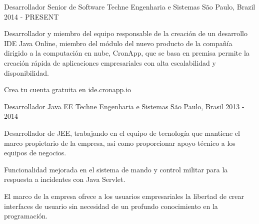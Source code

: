 

\begin{cventries}

  \cventry
    {Desarrollador Senior de Software} %
    {Techne Engenharia e Sistemas} %
    {São Paulo, Brazil} %
    {2014 - PRESENT} %
    {
      \begin{cvitems} %
        \item {Desarrollador y miembro del equipo responsable de la creación de un desarrollo IDE Java Online, miembro del módulo del nuevo producto de la compañía dirigido a la computación en nube, CronApp, que se basa en premisa permite la creación rápida de aplicaciones empresariales con alta escalabilidad y disponibilidad.}
        \item {Crea tu cuenta gratuita en ide.cronapp.io}
      \end{cvitems}
    }

  \cventry
    {Desarrollador Java EE} %
    {Techne Engenharia e Sistemas} %
    {São Paulo, Brasil} %
    {2013 - 2014} %
    {
      \begin{cvitems} %
        \item {Desarrollador de JEE, trabajando en el equipo de tecnología que mantiene el marco propietario de la empresa, así como proporcionar apoyo técnico a los equipos de negocios.}
        \item {Funcionalidad mejorada en el sistema de mando y control militar para la respuesta a incidentes con Java Servlet.}
        \item {El marco de la empresa ofrece a los usuarios empresariales la libertad de crear interfaces de usuario sin necesidad de un profundo conocimiento en la programación.}
      \end{cvitems}
    }


\end{cventries}
